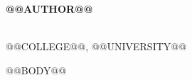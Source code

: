 \documentclass[UTF8,zihao=5,fontset=none]{ctexart}
\begin{document}
{\LARGE\bfseries @@AUTHOR@@}\hfill
\begin{minipage}[t]{0.55\textwidth}
\raggedleft
{}\quad {}\\
@@COLLEGE@@, @@UNIVERSITY@@
\end{minipage}

\vspace{0.5em}
@@BODY@@
\end{document}
